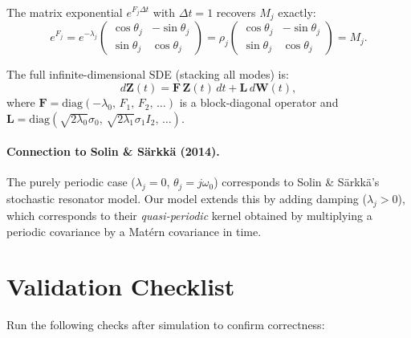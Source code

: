 \documentclass[12pt]{article}
\begin{document}
The matrix exponential $e^{F_j \Delta t}$ with $\Delta t = 1$ recovers $M_j$ exactly:
\[
  e^{F_j} = e^{-\lambda_j}
  \begin{pmatrix} \cos\theta_j & -\sin\theta_j \\ \sin\theta_j & \cos\theta_j \end{pmatrix}
  = \rho_j \begin{pmatrix} \cos\theta_j & -\sin\theta_j \\ \sin\theta_j & \cos\theta_j \end{pmatrix}
  = M_j.
\]

The full infinite-dimensional SDE (stacking all modes) is:
\[
  d\mathbf{Z}(t) = \mathbf{F}\,\mathbf{Z}(t)\,dt + \mathbf{L}\,d\mathbf{W}(t),
\]
where $\mathbf{F} = \mathrm{diag}(-\lambda_0,\, F_1,\, F_2,\, \ldots)$ is a block-diagonal
operator and $\mathbf{L} = \mathrm{diag}(\sqrt{2\lambda_0}\sigma_0,\, \sqrt{2\lambda_1}\sigma_1 I_2,\, \ldots)$.

\paragraph{Connection to Solin \& S\"{a}rkk\"{a} (2014).}
The purely periodic case ($\lambda_j = 0$, $\theta_j = j\omega_0$) corresponds to Solin \&
S\"{a}rkk\"{a}'s stochastic resonator model. Our model extends this by adding damping ($\lambda_j > 0$),
which corresponds to their \emph{quasi-periodic} kernel obtained by multiplying a periodic covariance
by a Mat\'{e}rn covariance in time.

\section{Validation Checklist}

Run the following checks after simulation to confirm correctness:
\end{document}
